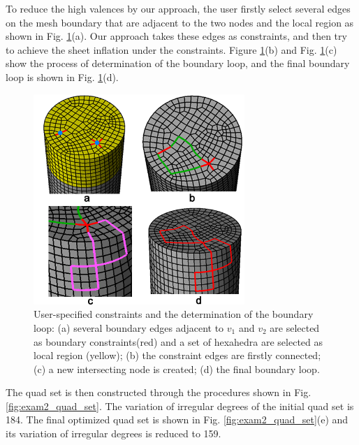 \documentclass[final,5p,times,twocolumn]{elsarticle}
\begin{document}
To reduce the high valences by our approach, the user firstly select several edges on the mesh boundary that are adjacent to the two nodes and the local region as shown in Fig. \ref{fig:exam2_bound_loop}(a). Our approach takes these edges as constraints, and then try to achieve the sheet inflation under the constraints. Figure \ref{fig:exam2_bound_loop}(b) and Fig. \ref{fig:exam2_bound_loop}(c) show the process of determination of the boundary loop, and the final boundary loop is shown in Fig. \ref{fig:exam2_bound_loop}(d).

\begin{figure}[htbp]
\begin{center}
\includegraphics[width=8cm]{exam2_bound_loop.png}
\caption{User-specified constraints and the determination of the boundary loop: (a) several boundary edges adjacent to $v_1$ and $v_2$ are selected as boundary constraints(red) and a set of hexahedra are selected as local region (yellow); (b) the constraint edges are firstly connected; (c) a new intersecting node is created; (d) the final boundary loop.}
\label{fig:exam2_bound_loop}
\end{center}
\end{figure}

The quad set is then constructed through the procedures shown in Fig. \ref{fig:exam2_quad_set}. The variation of irregular degrees of the initial quad set is 184. The final optimized quad set is shown in Fig. \ref{fig:exam2_quad_set}(e) and its variation of irregular degrees is reduced to 159.
\end{document}
